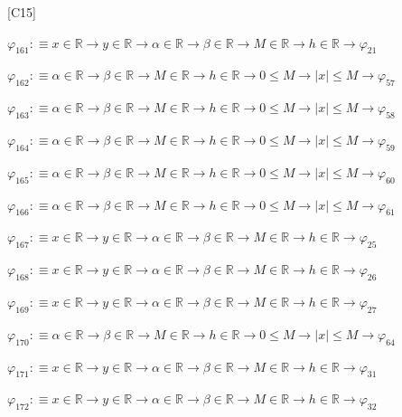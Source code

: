 \begin{fullproof}{[C15]}
\begin{abbrevlist}
\item $\varphi_{161} :\equiv x \in \mathbb{R} \to y \in \mathbb{R} \to \alpha \in \mathbb{R} \to \beta \in \mathbb{R} \to M \in \mathbb{R} \to h \in \mathbb{R} \to \varphi_{21}$
\item $\varphi_{162} :\equiv \alpha \in \mathbb{R} \to \beta \in \mathbb{R} \to M \in \mathbb{R} \to h \in \mathbb{R} \to 0 \leq M \to \lvert x \rvert \leq M \to \varphi_{57}$
\item $\varphi_{163} :\equiv \alpha \in \mathbb{R} \to \beta \in \mathbb{R} \to M \in \mathbb{R} \to h \in \mathbb{R} \to 0 \leq M \to \lvert x \rvert \leq M \to \varphi_{58}$
\item $\varphi_{164} :\equiv \alpha \in \mathbb{R} \to \beta \in \mathbb{R} \to M \in \mathbb{R} \to h \in \mathbb{R} \to 0 \leq M \to \lvert x \rvert \leq M \to \varphi_{59}$
\item $\varphi_{165} :\equiv \alpha \in \mathbb{R} \to \beta \in \mathbb{R} \to M \in \mathbb{R} \to h \in \mathbb{R} \to 0 \leq M \to \lvert x \rvert \leq M \to \varphi_{60}$
\item $\varphi_{166} :\equiv \alpha \in \mathbb{R} \to \beta \in \mathbb{R} \to M \in \mathbb{R} \to h \in \mathbb{R} \to 0 \leq M \to \lvert x \rvert \leq M \to \varphi_{61}$
\item $\varphi_{167} :\equiv x \in \mathbb{R} \to y \in \mathbb{R} \to \alpha \in \mathbb{R} \to \beta \in \mathbb{R} \to M \in \mathbb{R} \to h \in \mathbb{R} \to \varphi_{25}$
\item $\varphi_{168} :\equiv x \in \mathbb{R} \to y \in \mathbb{R} \to \alpha \in \mathbb{R} \to \beta \in \mathbb{R} \to M \in \mathbb{R} \to h \in \mathbb{R} \to \varphi_{26}$
\item $\varphi_{169} :\equiv x \in \mathbb{R} \to y \in \mathbb{R} \to \alpha \in \mathbb{R} \to \beta \in \mathbb{R} \to M \in \mathbb{R} \to h \in \mathbb{R} \to \varphi_{27}$
\item $\varphi_{170} :\equiv \alpha \in \mathbb{R} \to \beta \in \mathbb{R} \to M \in \mathbb{R} \to h \in \mathbb{R} \to 0 \leq M \to \lvert x \rvert \leq M \to \varphi_{64}$
\item $\varphi_{171} :\equiv x \in \mathbb{R} \to y \in \mathbb{R} \to \alpha \in \mathbb{R} \to \beta \in \mathbb{R} \to M \in \mathbb{R} \to h \in \mathbb{R} \to \varphi_{31}$
\item $\varphi_{172} :\equiv x \in \mathbb{R} \to y \in \mathbb{R} \to \alpha \in \mathbb{R} \to \beta \in \mathbb{R} \to M \in \mathbb{R} \to h \in \mathbb{R} \to \varphi_{32}$

\end{abbrevlist}
\end{fullproof}
